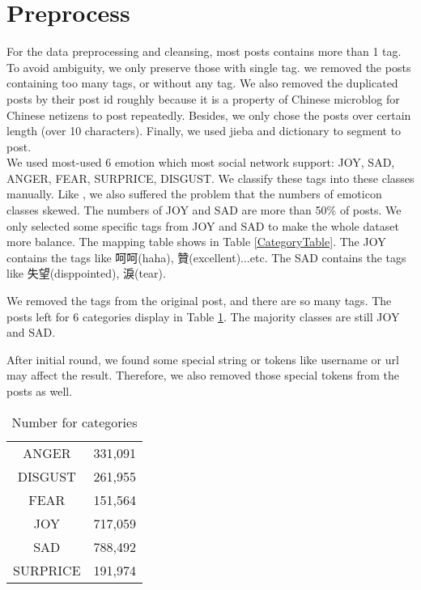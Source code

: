 \section{Preprocess}

For the data preprocessing and cleansing, most posts contains more than 1 tag. To avoid ambiguity, we only preserve those with single tag.
we removed the posts containing too many tags, or without any tag. We also removed the duplicated posts by their post id roughly because it is a property of Chinese microblog \cite{fu2013reality} for Chinese netizens to post repeatedly. 
Besides, we only chose the posts over certain length (over 10 characters). Finally, we used jieba and dictionary to segment to post. \\

We used most-used 6 emotion which most social network support: JOY, SAD, ANGER, FEAR, SURPRICE, DISGUST.
We classify these tags into these classes manually. 
Like \cite{zhao2012moodlens}, we also suffered the problem that the numbers of emoticon classes skewed. The numbers of JOY and SAD are more than 50\% of posts. 
We only selected some specific tags from JOY and SAD to make the whole dataset more balance.   
The mapping table shows in Table \ref{CategoryTable}. The JOY contains the tags like 呵呵(haha), 贊(excellent)...etc. 
The SAD contains the tags like 失望(disppointed), 淚(tear).


We removed the tags from the original post, and there are so many tags. 
The posts left for 6 categories display in Table \ref{cat_num}. The majority classes are still JOY and SAD. 

After initial round, we found some special string or tokens like username or url may affect the result. 
Therefore, we also removed those special tokens from the posts as well.

\begin{table}[]
\centering
\caption{Number for categories}
\label{cat_num}
\begin{tabular}{|c|c|}
\hline
ANGER      &331,091 \\                                                           
DISGUST    &261,955 \\                                                         
FEAR       &151,564 \\                                                         
JOY        &717,059 \\                                                           
SAD        &788,492 \\                                                           
SURPRICE   &191,974 \\
\hline
\end{tabular}
\end{table}


